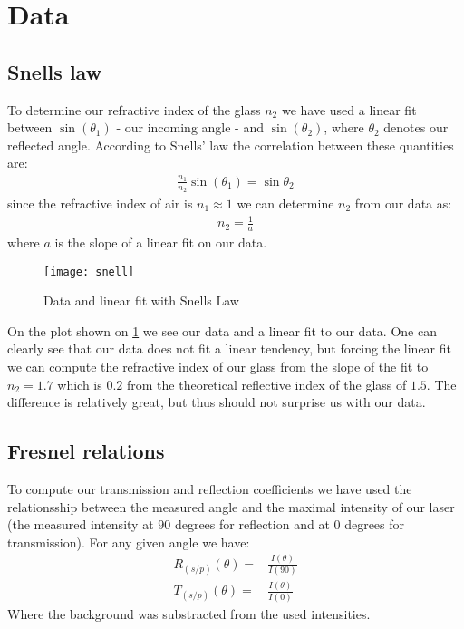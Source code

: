 \section{Data}
\subsection{Snells law}

To determine our refractive index of the glass $n_2$ we have used a linear fit between $\sin(\theta_1)$ - our incoming angle - and $\sin(\theta_2)$, where $\theta_2$ denotes our reflected angle. According to Snells' law the correlation between these quantities are:
%
\begin{align}
\frac{n_1}{n_2}\sin(\theta_1)=\sin{\theta_2}
\end{align}
%
since the refractive index of air is $n_1 \approx 1$ we can determine $n_2$ from our data as:
%
\begin{align}
n_2=\frac{1}{a}
\end{align}
%
where $a$ is the slope of a linear fit on our data. 
\begin{figure}[h!]
    \centering
    \texttt{[image: snell]}
    \caption{Data and linear fit with Snells Law}
    \label{fig:snell}
\end{figure}
\noindent
On the plot shown on \cref{fig:snell} we see our data and a linear fit to our data. One can clearly see that our data does not fit a linear tendency, but forcing the linear fit we can compute the refractive index of our glass from the slope of the fit to $n_2=1.7$ which is $0.2$ from the theoretical reflective index of the glass of $1.5$. The difference is relatively great, but thus should not surprise us with our data. 

\subsection{Fresnel relations}
To compute our transmission and reflection coefficients we have used the relationsship between the measured angle and the maximal intensity of our laser (the measured intensity at $90$ degrees for reflection and at $0$ degrees for transmission). For any given angle we have:
%
\begin{align}
    R_{(s/p)}(\theta)=&\frac{I(\theta)}{I(90)} \\
    T_{(s/p)}(\theta)=&\frac{I(\theta)}{I(0)}
\end{align}
%
Where the background was substracted from the used intensities. 

